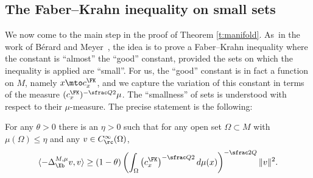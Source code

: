\subsection{The Faber--Krahn inequality on small sets}
We now come to the main step in the proof of Theorem \ref{t:manifold}. As~in the work of Bérard and Meyer~\cite{BerMe}, the idea is to prove a Faber--Krahn inequality where the constant is ``almost'' the ``good'' constant, provided the sets on which the inequality is applied are ``small''. For us, the ``good'' constant is in fact a function on $M$, namely $x\mto c^\FK_x$, and we capture the variation of this constant in terms of the measure $(c_x^\FK)^{-\sfrac Q2}\mu$. The ``smallness'' of sets is understood with respect to their $\mu$-measure. The precise statement is the following:

\begin{proposition}\label{faberkrahnbm}
For any $\theta>0$ there is an $\eta>0$ such that for any open set $\Omega\subset M$ with $\mu(\Omega)\leq\eta$ and any $v\in C^\infty_\rc(\Omega)$,
\begin{equation}
\langle -\Delta^{M,\mu}_\Xb v,v \rangle \geq (1-\theta) \left(\int_\Omega \left(c_x^\FK\right)^{-\sfrac Q2} d\mu(x)\right)^{-\sfrac2Q} \| v\|^2.
\end{equation}
\end{proposition}

